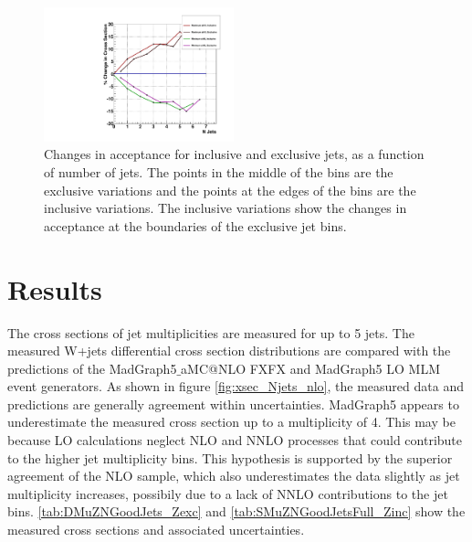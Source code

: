 \documentclass[oneside, letterpaper, oldfontcommands]{memoir}
\begin{document}
\begin{figure}[hbt]\centering
\includegraphics[width=0.49\textwidth]{energyScalesMinMaxWJets.pdf}
 \centering 
 \caption{Changes in acceptance for inclusive and exclusive jets, as a function of number of jets. The points in the middle of the bins are the exclusive variations and the points at the edges of the bins are the inclusive variations. The inclusive variations show the changes in acceptance at the boundaries of the exclusive jet bins.}
 \label{fig:acceptances}\end{figure}
 
\section{Results}
\qquad The cross sections of jet multiplicities are measured for up to 5 jets. The measured W+jets differential cross section distributions are compared with the predictions of the {\sc MadGraph5$\_$aMC@NLO} FXFX and {\sc MadGraph}5 LO MLM event generators. As shown in figure \ref{fig:xsec_Njets_nlo}, the measured data and predictions are generally agreement within uncertainties. {\sc MadGraph}5 appears to underestimate the measured cross section up to a multiplicity of 4. This may be because LO calculations neglect NLO and NNLO processes that could contribute to the higher jet multiplicity bins. This hypothesis is supported by the superior agreement of the NLO sample, which also underestimates the data slightly as jet multiplicity increases, possibily due to a lack of NNLO contributions to the jet bins. \ref{tab:DMuZNGoodJets_Zexc} and \ref{tab:SMuZNGoodJetsFull_Zinc} show the measured cross sections and associated uncertainties. 
\end{document}
